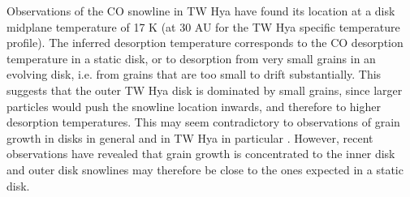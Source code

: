 \documentclass[apj]{emulateapj}
\newcommand{\emgr}[1]{\emph{ \color{gray} #1}}
\begin{document}
 Observations of the CO snowline in TW Hya \citep{qi13} have found its location at a disk midplane temperature of 17 K (at 30 AU for the TW Hya specific temperature profile). The inferred  desorption temperature corresponds to the CO desorption temperature in a static disk, or to desorption from very small grains in an evolving disk, i.e. from grains that are too small to drift substantially. This suggests that the outer TW Hya disk is dominated by small grains, since larger particles would push the snowline location inwards, and therefore to higher desorption temperatures. This may seem contradictory to observations of grain growth in disks in general and in TW Hya in particular \citep{wilner00}. However, recent observations have revealed that grain growth is concentrated to the inner disk \citep{perez12} and outer disk snowlines may therefore be close to the ones expected in a static disk.








\end{document}
